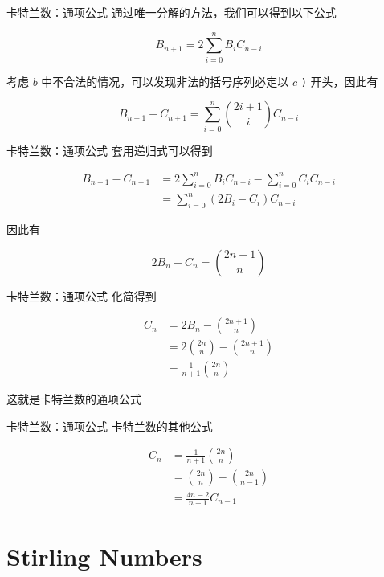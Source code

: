 \documentclass[12pt,aspectratio=169,handout]{beamer}
\begin{document}
\begin{frame}[fragile]{卡特兰数：通项公式}
  通过唯一分解的方法，我们可以得到以下公式

  $$
  B_{n+1} = 2 \sum_{i=0}^{n}B_{i}C_{n-i}
  $$

  考虑 $b$ 中不合法的情况，可以发现非法的括号序列必定以 $c$ \verb|)| 开头，因此有

  $$
  B_{n+1} - C_{n+1} = \sum_{i=0}^{n} {2i+1 \choose i} C_{n-i}
  $$
\end{frame}

\begin{frame}[fragile]{卡特兰数：通项公式}
  套用递归式可以得到

  $$
  \begin{aligned}
  B_{n+1} - C_{n+1} &= 2 \sum_{i=0}^{n} B_{i} C_{n-i} - \sum_{i=0}^n C_{i} C_{n-i} \\
  &= \sum_{i=0}^{n} (2 B_{i} - C_{i}) C_{n-i}
  \end{aligned}
  $$

  因此有

  $$
  2 B_{n} - C_{n} = {2n+1 \choose n}
  $$
\end{frame}

\begin{frame}[fragile]{卡特兰数：通项公式}
  化简得到

  $$
  \begin{aligned}
  C_{n} &= 2 B_{n} - {2n+1 \choose n} \\
  &= 2 {2n \choose n} - {2n+1 \choose n} \\
  &= \frac{1}{n+1} {2n \choose n}
  \end{aligned}
  $$

  这就是卡特兰数的通项公式
\end{frame}

\begin{frame}[fragile]{卡特兰数：通项公式}
  卡特兰数的其他公式

  $$
  \begin{aligned}
  C_{n} &= \frac{1}{n+1} {2n \choose n} \\
  &= {2n \choose n} - {2n \choose n - 1} \\
  &= \frac{4n-2}{n+1} C_{n-1}
  \end{aligned}
  $$
\end{frame}

\section[斯特林数]{Stirling Numbers}
\end{document}
